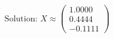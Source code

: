 \documentclass[preview]{standalone}
\begin{document}
\begin{align*}
\text{Solution: } X \approx \begin{pmatrix} 1.0000 \\ 0.4444 \\ -0.1111 \end{pmatrix}
\end{align*}
\end{document}
